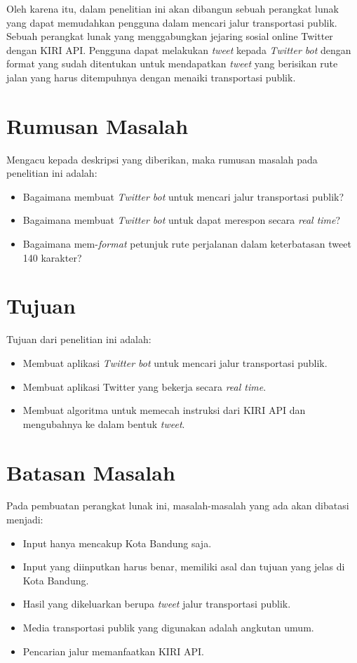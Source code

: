 Oleh karena itu, dalam penelitian ini akan dibangun sebuah perangkat lunak yang dapat memudahkan pengguna dalam mencari jalur transportasi publik. Sebuah perangkat lunak yang menggabungkan jejaring sosial online Twitter dengan KIRI API. Pengguna dapat melakukan \textit{tweet} kepada \textit{Twitter bot} dengan format yang sudah ditentukan untuk mendapatkan \textit{tweet} yang berisikan rute jalan yang harus ditempuhnya dengan menaiki transportasi publik.

\section{Rumusan Masalah}
Mengacu kepada deskripsi yang diberikan, maka rumusan masalah pada penelitian ini adalah:
\begin{itemize}
	\item Bagaimana membuat \textit{Twitter bot} untuk mencari jalur transportasi publik?
	\item Bagaimana membuat \textit{Twitter bot} untuk dapat merespon secara \textit{real time}?
	\item Bagaimana mem-\textit{format} petunjuk rute perjalanan dalam keterbatasan tweet 140 karakter?
\end{itemize}

\section{Tujuan}
Tujuan dari penelitian ini adalah:
\begin{itemize}
	\item Membuat aplikasi \textit{Twitter bot} untuk mencari jalur transportasi publik.
	\item Membuat aplikasi Twitter yang bekerja secara \textit{real time}.
	\item Membuat algoritma untuk memecah instruksi dari KIRI API dan mengubahnya ke dalam bentuk \textit{tweet}.
\end{itemize}

\section{Batasan Masalah}
Pada pembuatan perangkat lunak ini, masalah-masalah yang ada akan dibatasi menjadi:
\begin{itemize}
	\item Input hanya mencakup Kota Bandung saja.
	\item Input yang diinputkan harus benar, memiliki asal dan tujuan yang jelas di Kota Bandung.
	\item Hasil yang dikeluarkan berupa \textit{tweet} jalur transportasi publik.
	\item Media transportasi publik yang digunakan adalah angkutan umum.
	\item Pencarian jalur memanfaatkan KIRI API.
\end{itemize}

